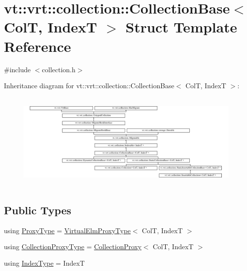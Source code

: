 \hypertarget{structvt_1_1vrt_1_1collection_1_1_collection_base}{}\section{vt\+:\+:vrt\+:\+:collection\+:\+:Collection\+Base$<$ ColT, IndexT $>$ Struct Template Reference}
\label{structvt_1_1vrt_1_1collection_1_1_collection_base}


{\ttfamily \#include $<$collection.\+h$>$}

Inheritance diagram for vt\+:\+:vrt\+:\+:collection\+:\+:Collection\+Base$<$ ColT, IndexT $>$\+:\begin{figure}[H]
\begin{center}
\leavevmode
\includegraphics[height=4.873803cm]{structvt_1_1vrt_1_1collection_1_1_collection_base}
\end{center}
\end{figure}
\subsection*{Public Types}
\begin{DoxyCompactItemize}
\item 
using \hyperlink{structvt_1_1vrt_1_1collection_1_1_collection_base_a0c2fd2443732bebc963f6278b7ba089b}{Proxy\+Type} = \hyperlink{namespacevt_1_1vrt_a620a5c8c59d13e513f690c74b4af516f}{Virtual\+Elm\+Proxy\+Type}$<$ ColT, IndexT $>$
\item 
using \hyperlink{structvt_1_1vrt_1_1collection_1_1_collection_base_af40b40a2ee128748bcb917f14a0152b4}{Collection\+Proxy\+Type} = \hyperlink{structvt_1_1vrt_1_1collection_1_1_collection_proxy}{Collection\+Proxy}$<$ ColT, IndexT $>$
\item 
using \hyperlink{structvt_1_1vrt_1_1collection_1_1_collection_base_ac1fbcd7655ac53ee681964cee23c5d1e}{Index\+Type} = IndexT
\end{DoxyCompactItemize}
